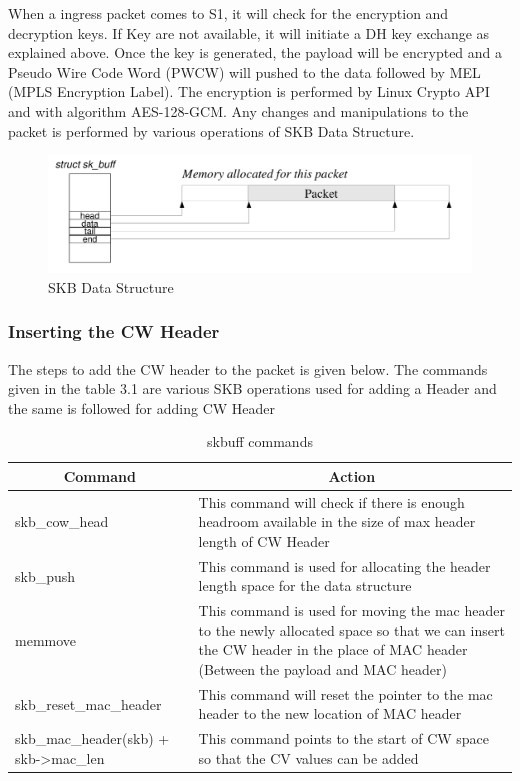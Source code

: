 When a ingress packet comes to S1, it will check for the encryption and decryption keys. If Key are not available, it will initiate a DH key exchange as explained above. Once the key is generated, the payload will be encrypted and a Pseudo Wire Code Word (PWCW) will pushed to the data followed by MEL (MPLS Encryption Label). The encryption is performed by Linux Crypto API and with algorithm AES-128-GCM. Any changes and manipulations to the packet is performed by various operations of SKB Data Structure.\\

\begin{figure}
       \centering\includegraphics[width=\textwidth]{Final/skbuff.png}
       \caption{SKB Data Structure}
       \label{fig:compbest}
\end{figure}

\subsubsection{Inserting the CW Header}
The steps to add the CW header to the packet is given below.  
The commands given in the table 3.1 are various SKB operations\cite{skbuff2} used for adding a Header and the same is followed for adding CW Header

\begin{table}[htbp]
  \centering
  \caption{skbuff commands}
    \begin{tabular}{|l|p{23.39em}|}
    \toprule
    \hline
    \multicolumn{1}{|c|}{Command} & \multicolumn{1}{c|}{Action} \\
    \midrule
    \hline
    skb\_cow\_head & This command will check if there is enough headroom available in the size of max header length of CW Header \\
    \midrule
    \hline
    skb\_push & This command is used for allocating the header length space for the data structure \\
    \midrule
    \hline
    memmove & This command is used for moving the mac header to the newly allocated space so that we can insert the CW header in the place of MAC header (Between the payload and MAC header) \\
    \midrule
    \hline
    skb\_reset\_mac\_header & This command will reset the pointer to the mac header to the new location of MAC header \\
    \midrule
    \hline
    skb\_mac\_header(skb) + skb->mac\_len & This command points to the start of CW space so that the CV values can be added \\
    \hline
    \bottomrule
    \end{tabular}%
  \label{tab:addlabel}%
\end{table}%



